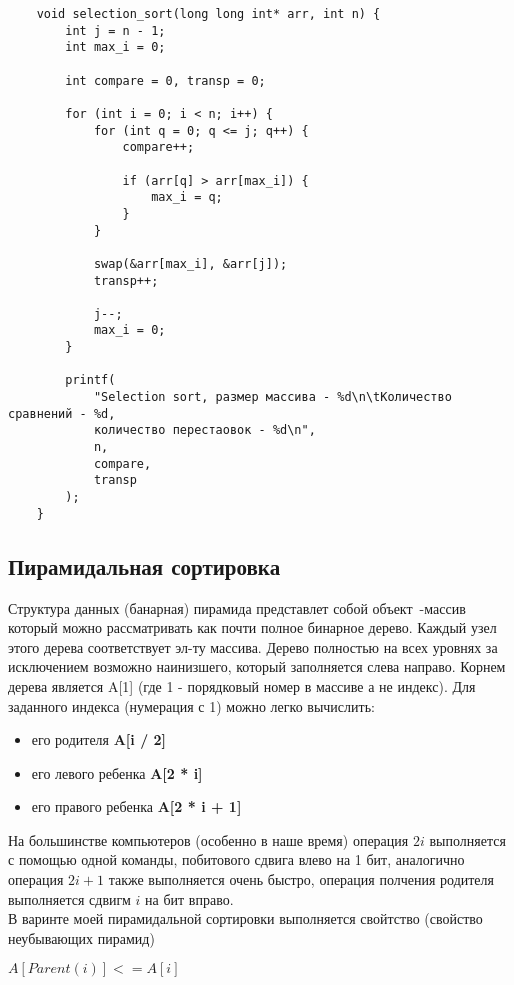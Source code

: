 \documentclass[a4paper,12pt,titlepage,finall]{article}
\begin{document}
\begin{verbatim}
    void selection_sort(long long int* arr, int n) {
        int j = n - 1;
        int max_i = 0;

        int compare = 0, transp = 0;

        for (int i = 0; i < n; i++) {
            for (int q = 0; q <= j; q++) {
                compare++;

                if (arr[q] > arr[max_i]) {
                    max_i = q;  
                }
            }

            swap(&arr[max_i], &arr[j]);
            transp++;

            j--;
            max_i = 0;
        }

        printf(
            "Selection sort, размер массива - %d\n\tКоличество сравнений - %d,
            количество перестаовок - %d\n",
            n,
            compare,
            transp
        );
    }
\end{verbatim}


\newpage

\subsection{Пирамидальная сортировка}

Структура данных (банарная) пирамида представлет
собой объект~-массив который можно рассматривать как почти полное бинарное дерево.
Каждый узел этого дерева соответствует эл-ту массива. Дерево полностью на всех уровнях 
за исключением возможно наинизшего, который заполняется слева направо.
Корнем дерева является A[1] (где 1 - порядковый номер в массиве а не индекс). Для заданного 
индекса (нумерация с 1) можно легко вычислить:
\begin{itemize}
    \item его родителя \textbf{A[i / 2]}
    \item его левого ребенка \textbf{A[2 * i]}
    \item его правого ребенка \textbf{A[2 * i + 1]}
\end{itemize}

На большинстве компьютеров (особенно в наше время) операция $2i$ выполняется с помощью одной
команды, побитового сдвига влево на 1 бит, аналогично 
операция $2i + 1$ также выполняется очень быстро, операция полчения родителя выполняется
сдвигм $i$ на бит вправо.\\
В варинте моей пирамидальной сортировки выполняется свойтство (свойство неубывающих пирамид) \\
\begin{center}
    $A[Parent(i)] <= A[i]$
\end{center}
\end{document}
